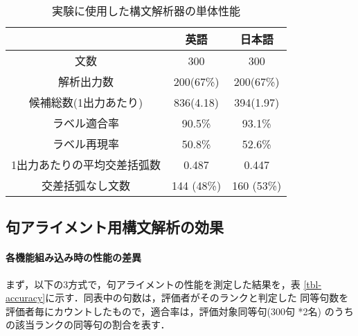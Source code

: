 \begin{table*}
\begin{center}
\caption{実験に使用した構文解析器の単体性能}
\label{tbl-parsing-accuracy}
{\smalltable
\begin{tabular}{ccc}
\hline\hline
                            & 英語       & 日本語     \\
\hline
文数                        & 300        & 300        \\
解析出力数                  & 200(67\%)  & 200(67\%)  \\
候補総数(1出力あたり)       & 836(4.18)  & 394(1.97)  \\
ラベル適合率                & 90.5\%     & 93.1\%     \\
ラベル再現率                & 50.8\%     & 52.6\%     \\
1出力あたりの平均交差括弧数 & 0.487      & 0.447      \\
交差括弧なし文数            & 144 (48\%) & 160 (53\%) \\
\hline\hline
\end{tabular}
}
\end{center}
\end{table*}


\subsection{句アライメント用構文解析の効果}

\paragraph{各機能組み込み時の性能の差異}

まず，以下の3方式で，句アライメントの性能を測定した結果を，表
\ref{tbl-accuracy}に示す．同表中の句数は，評価者がそのランクと判定した
同等句数を評価者毎にカウントしたもので，適合率は，評価対象同等句(300句
*2名) のうちの該当ランクの同等句の割合を表す．

\label{case-part}

\label{case-one}

\label{case-pscore}

